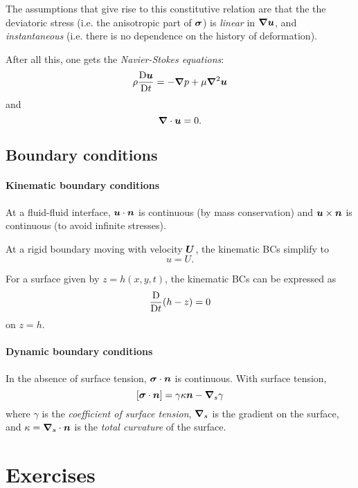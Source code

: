 \documentclass{article}
\begin{document}
The assumptions that give rise to this constitutive relation are that the the
deviatoric stress (i.e. the anisotropic part of $\boldsymbol{\sigma}$) is
\textit{linear} in $\boldsymbol{\nabla}\boldsymbol{u}$, and \textit{instantaneous} (i.e. there is no
dependence on the history of deformation). 

After all this, one gets the \textit{Navier-Stokes equations}:
$$ \rho\frac{\mathrm{D}\boldsymbol{u}}{\mathrm{D}t} = -\boldsymbol{\nabla} p + \mu\boldsymbol{\nabla}^2 \boldsymbol{u} $$
and 
$$ \boldsymbol{\nabla}\cdot\boldsymbol{u} = 0. $$

\subsection{Boundary conditions}

\paragraph{Kinematic boundary conditions}  At a fluid-fluid interface,
$\boldsymbol{u}\cdot\boldsymbol{n}$ is continuous (by mass conservation) and
$\boldsymbol{u}\times\boldsymbol{n}$ is continuous (to avoid infinite stresses). 

At a rigid boundary moving with velocity $\boldsymbol{U}$, the kinematic BCs simplify to
$$ u = U. $$

For a surface given by $z=h(x,y,t)$, the kinematic BCs can be expressed as
$$ \frac{\mathrm{D}}{\mathrm{D}t}(h-z) = 0 $$
on $z=h$.

\paragraph{Dynamic boundary conditions} In the absence of surface tension,
$\boldsymbol{\sigma}\cdot\boldsymbol{n}$ is continuous. With surface tension,
$$ [\boldsymbol{\sigma}\cdot\boldsymbol{n}] = \gamma\kappa\boldsymbol{n} - \boldsymbol{\nabla}_s\gamma $$
where $\gamma$ is the \textit{coefficient of surface tension}, $\boldsymbol{\nabla}_s$ is the
gradient on the surface, and $\kappa = \boldsymbol{\nabla}_s\cdot\boldsymbol{n}$ is the
\textit{total curvature} of the surface.

\section{Exercises}
\end{document}
